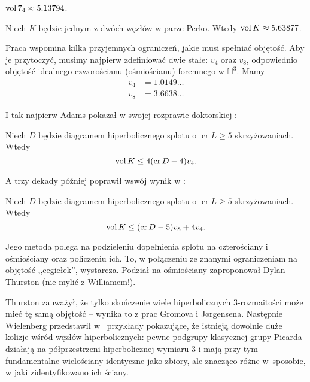 \begin{example}
    $\operatorname{vol} 7_4 \approx 5.13794$.
\end{example}

\begin{example}
    Niech $K$ będzie jednym z dwóch węzłów w parze Perko.
    Wtedy $\operatorname{vol} K \approx 5.63877$.
\end{example}

Praca \cite{purcell19} wspomina kilka przyjemnych ograniczeń, jakie musi spełniać objętość.
Aby je przytoczyć, musimy najpierw zdefiniować dwie stałe: $v_4$ oraz $v_8$, odpowiednio objętość idealnego czworościanu (ośmiościanu) foremnego w $\mathbb H^3$.
Mamy
\begin{align}
    v_4 & = 1.0149\ldots \\
    v_8 & = 3.6638\ldots
\end{align}

I tak najpierw Adams pokazał w swojej rozprawie doktorskiej \cite{adams83}:

\begin{proposition}
    Niech $D$ będzie diagramem hiperbolicznego splotu o $\operatorname{cr} L \ge 5$ skrzyżowaniach.
    Wtedy
    \begin{equation}
        \operatorname{vol} K \le 4 (\operatorname{cr} D - 4) v_4.
    \end{equation} 
\end{proposition}

A trzy dekady później poprawił wswój wynik w \cite{adams13}:

\begin{proposition}
    Niech $D$ będzie diagramem hiperbolicznego splotu o $\operatorname{cr} L \ge 5$ skrzyżowaniach.
    Wtedy
    \begin{equation}
        \operatorname{vol} K \le (\operatorname{cr} D - 5) v_8 + 4v_4.
    \end{equation} 
\end{proposition}

Jego metoda polega na podzieleniu dopełnienia splotu na czterościany i ośmiościany oraz policzeniu ich.
To, w połączeniu ze znanymi ograniczeniam na objętość ,,cegiełek'', wystarcza.
Podział na ośmiościany zaproponował Dylan Thurston (nie mylić z Williamem!).


Thurston zauważył, że tylko skończenie wiele hiperbolicznych 3-rozmaitości może mieć tę samą objętość -- wynika to z prac Gromova i Jørgensena.
Następnie Wielenberg przedstawił w~\cite{wielenberg81} przykłady pokazujące, że istnieją dowolnie duże kolizje wśród węzłów hiperbolicznych: pewne podgrupy klasycznej grupy Picarda działają  na półprzestrzeni hiperbolicznej wymiaru 3 i mają przy tym fundamentalne wielościany identyczne jako zbiory, ale znacząco różne w~sposobie, w jaki zidentyfikowano ich ściany.

